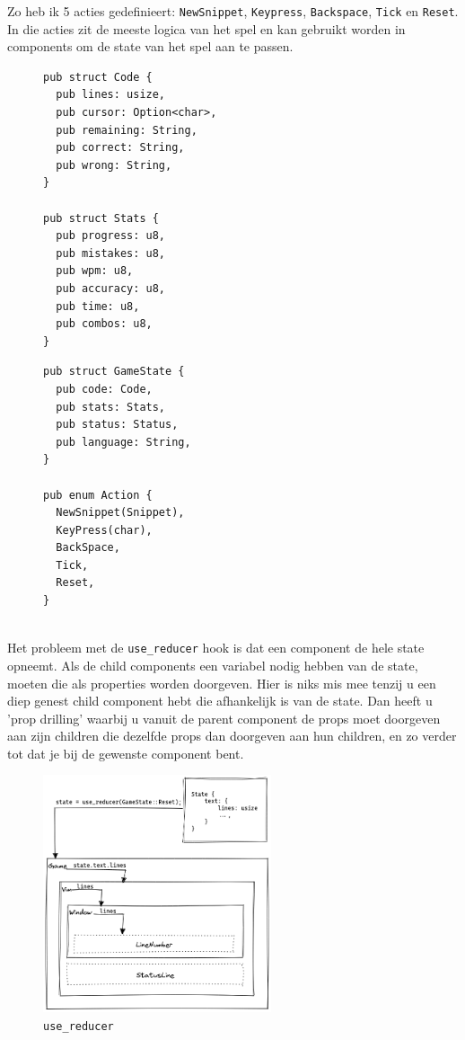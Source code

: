 Zo heb ik 5 acties gedefinieert: \texttt{NewSnippet}, \texttt{Keypress},
\texttt{Backspace}, \texttt{Tick} en \texttt{Reset}. In die acties zit
de meeste logica van het spel en kan gebruikt worden in components om de state van het spel aan te
passen. 

\begin{figure}[h]
\centering
\begin{minipage}{.45\textwidth}
\begin{verbatim}
pub struct Code {
  pub lines: usize,
  pub cursor: Option<char>,
  pub remaining: String,
  pub correct: String,
  pub wrong: String,
}

pub struct Stats {
  pub progress: u8,
  pub mistakes: u8,
  pub wpm: u8,
  pub accuracy: u8,
  pub time: u8,
  pub combos: u8,
}
\end{verbatim}
\end{minipage}%
\begin{minipage}{.45\textwidth}
\begin{verbatim}
pub struct GameState {
  pub code: Code,
  pub stats: Stats,
  pub status: Status,
  pub language: String,
}

pub enum Action {
  NewSnippet(Snippet),
  KeyPress(char),
  BackSpace,
  Tick,
  Reset,
}


\end{verbatim}
\end{minipage}
\end{figure}

Het probleem met de \texttt{use_reducer} hook is dat een component de hele state opneemt.
Als de child components een variabel nodig hebben van de state, moeten die als properties worden
doorgeven. Hier is niks mis mee tenzij u een diep genest child component hebt die afhankelijk is
van de state. Dan heeft u 'prop drilling' waarbij u vanuit de parent component de props moet
doorgeven aan zijn children die dezelfde props dan doorgeven aan hun children, en zo verder tot dat
je bij de gewenste component bent.

\clearpage

\begin{figure}[h]
  \centering
  \includegraphics[width=0.6\textwidth]{./figures/use_reducer.png}
  \caption{\texttt{use_reducer}}
\end{figure}

